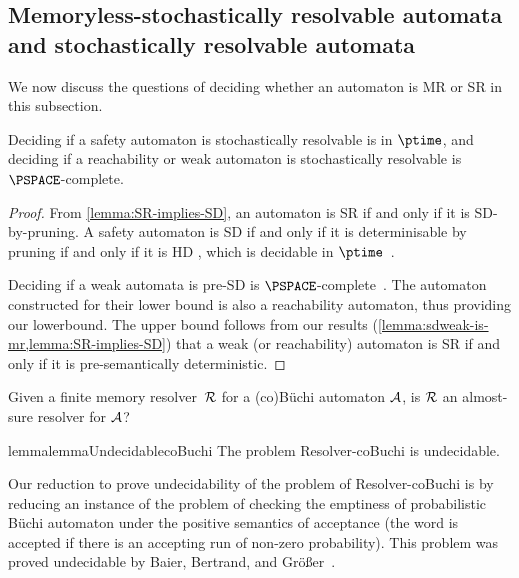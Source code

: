 \subsection{Memoryless-stochastically resolvable automata and stochastically resolvable automata}

We now discuss the questions of deciding whether an automaton is MR or SR in this subsection. 

\begin{proposition}\label{prop:safetyPTIME}\label{prop:reachweakPSPACE}
    Deciding if a safety automaton is stochastically resolvable is in $\ptime$, and deciding if a reachability or weak automaton is stochastically resolvable is $\PSPACE$-complete. 
\end{proposition}
\begin{proof}
    From \cref{lemma:SR-implies-SD}, an automaton is SR if and only if it is SD-by-pruning. A safety automaton is SD if and only if it is determinisable by pruning if and only if it is HD \cite[Theorem 19]{BL21}, which is decidable in $\ptime$~\cite{BL23quantitative}. 

    Deciding if a weak automata is pre-SD is  $\PSPACE$-complete~\cite[Theorem 3]{AKL21}. The automaton constructed for their lower bound is also a reachability automaton, thus providing our lowerbound. 
    The upper bound follows from our results (\cref{lemma:sdweak-is-mr,lemma:SR-implies-SD}) that a weak (or reachability) automaton is SR if and only if it is pre-semantically deterministic.
\end{proof}
\begin{question}
    Given a finite memory resolver~$\mathcal{R}$ for a (co)B\"uchi automaton $\mathcal{A}$, is $\mathcal{R}$ an almost-sure resolver for $\mathcal{A}$?
\end{question}
\begin{restatable}{lemma}{lemmaUndecidablecoBuchi}\label{lemma:UndecidablecoBuchi}
        The problem \textsf{Resolver-coBuchi} is undecidable.
\end{restatable}
Our reduction to prove undecidability of the problem of \textsf{Resolver-coBuchi} is by reducing an instance of the problem of checking the emptiness of probabilistic B\"uchi automaton under the positive semantics of acceptance (the word is accepted if there is an accepting run of non-zero probability). This problem was proved undecidable by Baier, Bertrand, and Gr\"o{\ss}er~\cite[Theorem~2]{BBG08}.    

